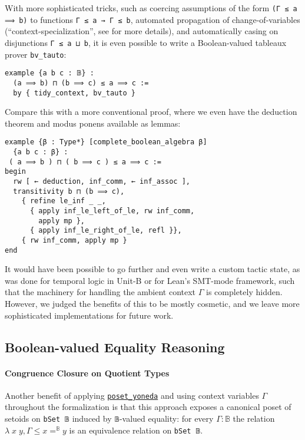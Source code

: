 \documentclass[sigplan,screen]{acmart}
\newcommand{\B}{\mathbb{B}}
\newcommand{\lil}{\lstinline}
\theoremstyle{definition}
\begin{document}
With more sophisticated tricks, such as coercing assumptions of the form \lil{(Γ ≤ a ⟹ b)} to functions \lil{Γ ≤ a → Γ ≤ b}, automated propagation of change-of-variables (``context-specialization'', see \cite{DBLP:conf/itp/HanD19} for more details), and automatically casing on disjunctions \lil{Γ ≤ a ⊔ b}, it is even possible to write a Boolean-valued tableaux prover \lil{bv_tauto}:
\begin{lstlisting}
example {a b c : 𝔹} :
  (a ⟹ b) ⊓ (b ⟹ c) ≤ a ⟹ c :=
  by { tidy_context, bv_tauto }
\end{lstlisting}
Compare this with a more conventional proof, where we even have the deduction theorem and modus ponens available as lemmas: %
\begin{lstlisting}
example {β : Type*} [complete_boolean_algebra β]
  {a b c : β} :
 ( a ⟹ b ) ⊓ ( b ⟹ c ) ≤ a ⟹ c :=
begin
  rw [ ← deduction, inf_comm, ← inf_assoc ],
  transitivity b ⊓ (b ⟹ c),
    { refine le_inf _ _,
      { apply inf_le_left_of_le, rw inf_comm,
        apply mp },
      { apply inf_le_right_of_le, refl }},
    { rw inf_comm, apply mp }
end
\end{lstlisting}

It would have been possible to go further and even write a custom tactic state,
as was done for temporal logic in Unit-B \cite{Hudon2015TheUM} or for Lean's SMT-mode framework,
such that the machinery for handling the ambient context \(\Gamma\) is completely hidden. %
However, we judged the benefits of this to be mostly cosmetic, and we leave more sophisticated implementations for future work.

\subsection{Boolean-valued Equality Reasoning}

\paragraph{Congruence Closure on Quotient Types} \label{subsect:bv-cc}
Another benefit of applying \hyperref[poset-yoneda]{\lstinline{poset_yoneda}} and using context variables \(\Gamma\) throughout the formalization is that this approach exposes a canonical poset of setoids on \lil{bSet 𝔹} induced by \lil{𝔹}-valued equality:
for every \(\Gamma : \mathbb{B}\) the relation \(\lambda\; x \; y, \Gamma \leq x =^{\mathbb{B}} y\) is an equivalence relation on \lil{bSet 𝔹}. %
\end{document}

